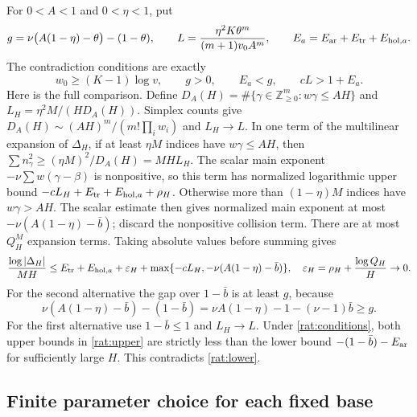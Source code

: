 \documentclass[11pt]{article}
\newcommand{\NN}{\mathbb Z_{\ge0}}
\theoremstyle{definition}
\theoremstyle{remark}
\numberwithin{equation}{section}
\begin{document}
For $0<A<1$ and $0<\eta<1$, put
\begin{equation}
 g=\nu\bigl(A(1-\eta)-\theta\bigr)-(1-\theta),\qquad
 L=\frac{\eta^2K\theta^m}{(m+1)v_0A^m},\qquad
 E_a=E_{\rm ar}+E_{\rm tr}+E_{{\rm hol},a}.
 \label{rat:budgets}
\end{equation}
The contradiction conditions are exactly
\begin{equation}
 w_0\ge(K-1)\log v,\qquad g>0,\qquad E_a<g,
 \qquad cL>1+E_a.
 \label{rat:conditions}
\end{equation}
Here is the full comparison.  Define
$D_A(H)=\#\{\gamma\in\NN^m:w\gamma\le AH\}$ and
$L_H=\eta^2M/(HD_A(H))$.  Simplex counts give
$D_A(H)\sim(AH)^m/(m!\prod_iw_i)$ and $L_H\to L$.
In one term of the multilinear expansion of $\Delta_H$, if at least
$\eta M$ indices have $w\gamma\le AH$, then
$\sum n_\gamma^2\ge(\eta M)^2/D_A(H)=MH L_H$.
The scalar main exponent $-\nu\sum w(\gamma-\beta)$ is nonpositive,
so this term has normalized logarithmic upper bound
$-cL_H+E_{\rm tr}+E_{{\rm hol},a}+\rho_H$.
Otherwise more than $(1-\eta)M$ indices have $w\gamma>AH$.
The scalar estimate then gives normalized main exponent at most
$-\nu(A(1-\eta)-\bar b)$; discard the nonpositive collision term.
There are at most $Q_H^M$ expansion terms.  Taking absolute values
before summing gives
\begin{equation}
 \frac{\log|\Delta_H|}{MH}
 \le E_{\rm tr}+E_{{\rm hol},a}+\varepsilon_H
    +\max\{-cL_H,-\nu(A(1-\eta)-\bar b)\},
 \quad\varepsilon_H=\rho_H+\frac{\log Q_H}{H}\to0.
 \label{rat:upper}
\end{equation}
For the second alternative the gap over $1-\bar b$ is at least $g$,
because
\[
 \nu(A(1-\eta)-\bar b)-(1-\bar b)
 =\nu A(1-\eta)-1-(\nu-1)\bar b\ge g.
\]
For the first alternative use $1-\bar b\le1$ and $L_H\to L$.
Under \eqref{rat:conditions}, both upper bounds in
\eqref{rat:upper} are strictly less than the lower bound
$-(1-\bar b)-E_{\rm ar}$ for sufficiently large $H$.  This
contradicts \eqref{rat:lower}.

\subsection{Finite parameter choice for each fixed base}
\end{document}
